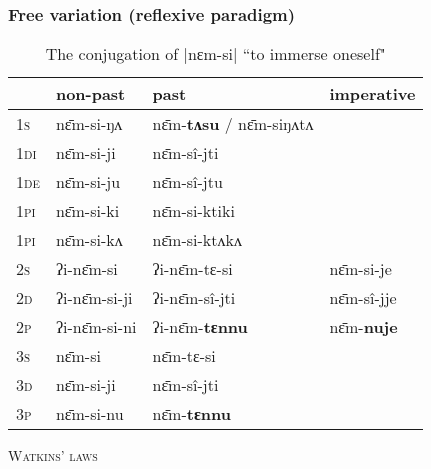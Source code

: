 \documentclass[xcolor=table]{beamer}
\newcommand{\ipa}[1]{{\phon \mbox{#1}}} %
\newcommand{\grise}[1]{\cellcolor{lightgray}\textbf{#1}}
\begin{document}
    
  \begin{frame} 
 \frametitle{Free variation (reflexive paradigm)} 
 

\begin{table}[h]
\caption{The conjugation of |\ipa{nɛm-si}|  ``to immerse oneself"  } \centering \label{tab:nyamsi}
\begin{tabular}{l|l|l|l}  
\hline
& non-past & past & imperative\\
\hline
\textsc{1s}  &  \ipa{nɛ̄m-si-ŋʌ}   &  \ipa{nɛ̄m-\textbf{tʌsu}} / \ipa{nɛ̄m-siŋʌtʌ}  \grise{}\\ 
\textsc{1di}  &  \ipa{nɛ̄m-si-ji}   &  \ipa{nɛ̄m-sî-jti} \\
\textsc{1de}  &  \ipa{nɛ̄m-si-ju}   &  \ipa{nɛ̄m-sî-jtu} \\ 
\textsc{1pi}  &  \ipa{nɛ̄m-si-ki}   &  \ipa{nɛ̄m-si-ktiki} \\ 
\textsc{1pi}  &  \ipa{nɛ̄m-si-kʌ}   &  \ipa{nɛ̄m-si-ktʌkʌ} \\ 
\hline
\textsc{2s}  &  \ipa{ʔi-nɛ̄m-si}   &  \ipa{ʔi-nɛ̄m-tɛ-si}   &  \ipa{nɛ̄m-si-je} \\ 
\textsc{2d}  &  \ipa{ʔi-nɛ̄m-si-ji}   &  \ipa{ʔi-nɛ̄m-sî-jti}   &  \ipa{nɛ̄m-sî-jje} \\
\textsc{2p}  &  \ipa{ʔi-nɛ̄m-si-ni}   &  \ipa{ʔi-nɛ̄m-\textbf{tɛnnu}}   &  \ipa{nɛ̄m-\textbf{nuje}} \\ 
\hline
\textsc{3s}  &  \ipa{nɛ̄m-si}   &  \ipa{nɛ̄m-tɛ-si} \\ 
\textsc{3d}  &  \ipa{nɛ̄m-si-ji}   &  \ipa{nɛ̄m-sî-jti} \\ 
\textsc{3p}  &  \ipa{nɛ̄m-si-nu}   &  \ipa{nɛ̄m-\textbf{tɛnnu}}   \\ 
\hline
\end{tabular}
\end{table}

\textsc{Watkins' laws}
  \end{frame}   
  
\end{document}

